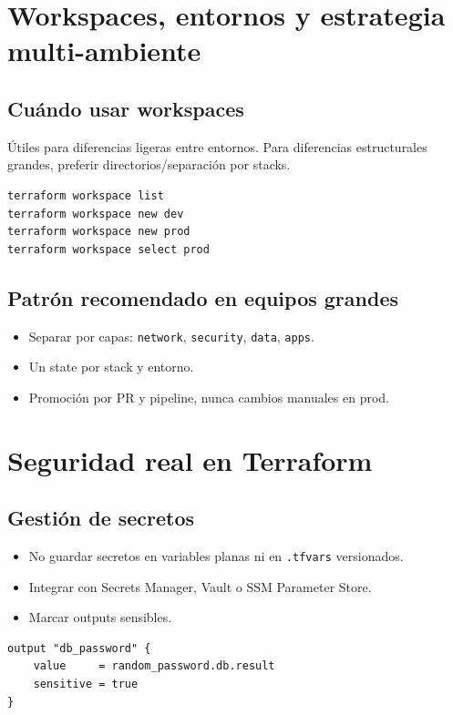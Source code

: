 \documentclass[12pt,a4paper]{article}
\begin{document}
\section{Workspaces, entornos y estrategia multi-ambiente}

\subsection{Cuándo usar workspaces}
Útiles para diferencias ligeras entre entornos. Para diferencias estructurales grandes, preferir directorios/separación por stacks.

\begin{lstlisting}[caption=Comandos de workspaces]
terraform workspace list
terraform workspace new dev
terraform workspace new prod
terraform workspace select prod
\end{lstlisting}

\subsection{Patrón recomendado en equipos grandes}
\begin{itemize}
		\item Separar por capas: \texttt{network}, \texttt{security}, \texttt{data}, \texttt{apps}.
		\item Un state por stack y entorno.
		\item Promoción por PR y pipeline, nunca cambios manuales en prod.
\end{itemize}

\section{Seguridad real en Terraform}

\subsection{Gestión de secretos}
\begin{itemize}
		\item No guardar secretos en variables planas ni en \texttt{.tfvars} versionados.
		\item Integrar con Secrets Manager, Vault o SSM Parameter Store.
		\item Marcar outputs sensibles.
\end{itemize}

\begin{lstlisting}[caption=Output sensible]
output "db_password" {
	value     = random_password.db.result
	sensitive = true
}
\end{lstlisting}
\end{document}
